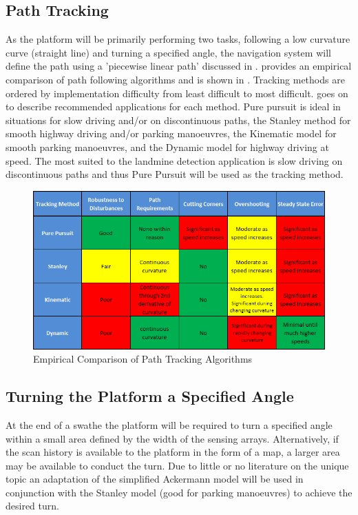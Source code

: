\documentclass[main.tex]{subfiles}
\begin{document}
\subsection{Path Tracking}
As the platform will be primarily performing two tasks, following a low curvature curve (straight line) and turning a specified angle, the navigation system will define the path using a 'piecewise linear path' discussed in . \Textcite{snider2009} provides an empirical comparison of path following algorithms and is shown in . Tracking methods are ordered by implementation difficulty from least difficult to most difficult. \Textcite{snider2009} goes on to describe recommended applications for each method.  Pure pursuit is ideal in situations for slow driving and/or on discontinuous paths, the Stanley method for smooth highway driving and/or parking manoeuvres, the Kinematic model for smooth parking manoeuvres, and the Dynamic model for highway driving at speed. The most suited to the landmine detection application is slow driving on discontinuous paths and thus Pure Pursuit will be used as the tracking method.
\begin{figure}[ht]
\includegraphics[width = \textwidth]{4-ConceptDesign/pathTrackingSummary2.png}
\centering
\caption[Empirical Comparison of Path Tracking Algorithms]{Empirical Comparison of Path Tracking Algorithms \parencite{snider2009}} 
\end{figure}

\subsection{Turning the Platform a Specified Angle}
At the end of a swathe the platform will be required to turn a specified angle within a small area defined by the width of the sensing arrays. Alternatively, if the scan history is available to the platform in the form of a map, a larger area may be available to conduct the turn. Due to little or no literature on the unique topic an adaptation of the simplified Ackermann model will be used in conjunction with the Stanley model (good for parking manoeuvres) to achieve the desired turn.
\end{document}

